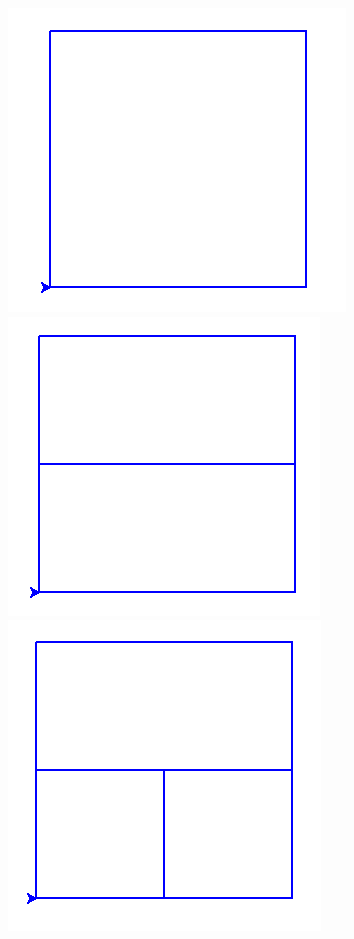 \documentclass[11pt,class=report,crop=false]{standalone}
\begin{document}
\begin{activite}
\begin{center}
\includegraphics[scale=\myscale,scale=0.3]{ecran-carre-0}\qquad
\includegraphics[scale=\myscale,scale=0.3]{ecran-carre-1}\qquad
\includegraphics[scale=\myscale,scale=0.3]{ecran-carre-2}\qquad

\end{center}
\end{activite}
\end{document}
